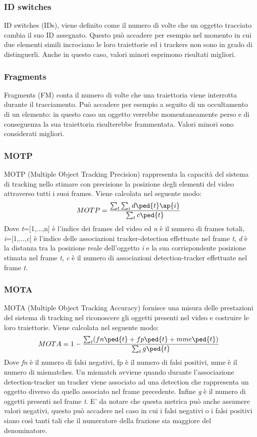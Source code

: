 \subsubsection{ID switches}
ID switches (IDs), viene definito come il numero di volte che un oggetto tracciato cambia il suo ID assegnato. Questo può accadere per esempio nel momento in cui due elementi simili incrociano le loro traiettorie ed i trackers non sono in grado di distinguerli. Anche in questo caso, valori minori esprimono risultati migliori.
\subsubsection{Fragments}
Fragments (FM) conta il numero di volte che una traiettoria viene interrotta durante il tracciamento. Può accadere per esempio a seguito di un occultamento di un elemento: in questo caso un oggetto verrebbe momentaneamente perso e di conseguenza la sua traiettoria risulterebbe frammentata. Valori minori sono considerati migliori. 
\subsubsection{MOTP}
MOTP (Multiple Object Tracking Precision)\cite{MOTmetrics} rappresenta la capacità del sistema di tracking nello stimare con precisione la posizione degli elementi del video attraverso tutti i suoi frames. Viene calcolata nel seguente modo:
\[
MOTP = \frac{\sum_{t}^{}\sum_{i}^{}d\ped{t}\ap{i}}{\sum_{t}^{}c\ped{t}}
\]
Dove \textit{t}=[1,...,n] è l'indice dei frames del video ed \textit{n} è il numero di frames totali, \textit{i}=[1,...,\textit{c}] è l'indice delle associazioni tracker-detection effettuate nel frame \textit{t}, \textit{d} è la distanza tra la posizione reale dell'oggetto \textit{i} e la sua corrispondente posizione stimata nel frame \textit{t}, \textit{c} è il numero di associazioni detection-tracker effettuate nel frame \textit{t}.
\subsubsection{MOTA}
MOTA (Multiple Object Tracking Accuracy)\cite{MOTmetrics} fornisce una misura delle prestazioni del sistema di tracking nel riconoscere gli oggetti presenti nel video e costruire le loro traiettorie. Viene calcolata nel seguente modo:
\[
MOTA = 1-\frac{\sum_{t}^{}(fn\ped{t}+fp\ped{t}+mme\ped{t})}{\sum_{t}^{}g\ped{t}}
\]
Dove \textit{fn} è il numero di falsi negativi, fp è il numero di falsi positivi, mme è il numero di mismatches. Un mismatch avviene quando durante l'associazione detection-tracker un tracker viene associato ad una detection che rappresenta un oggetto diverso da quello associato nel frame precedente. Infine  \textit{g} è il numero di oggetti presenti nel frame \textit{t}. E' da notare che questa metrica può anche assumere valori negativi, questo può accadere nel caso in cui i falsi negativi o i falsi positivi siano così tanti tali che il numeratore della frazione sia maggiore del denominatore.

